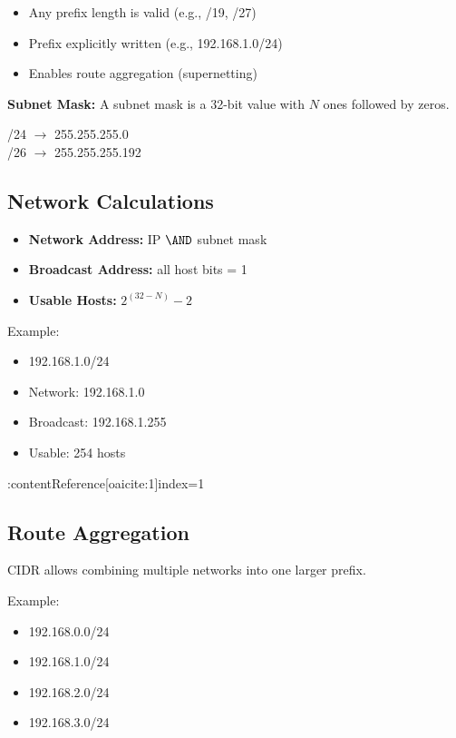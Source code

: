 \begin{itemize}
    \item Any prefix length is valid (e.g., /19, /27)
    \item Prefix explicitly written (e.g., 192.168.1.0/24)
    \item Enables route aggregation (supernetting)
\end{itemize}

\textbf{Subnet Mask:}
A subnet mask is a 32-bit value with $N$ ones followed by zeros.

\begin{center}
/24 $\rightarrow$ 255.255.255.0 \\
/26 $\rightarrow$ 255.255.255.192
\end{center}

\subsection{Network Calculations}
\begin{itemize}
    \item \textbf{Network Address:} IP $\AND$ subnet mask
    \item \textbf{Broadcast Address:} all host bits = 1
    \item \textbf{Usable Hosts:} $2^{(32-N)} - 2$
\end{itemize}

Example:
\begin{itemize}
    \item 192.168.1.0/24
    \item Network: 192.168.1.0
    \item Broadcast: 192.168.1.255
    \item Usable: 254 hosts
\end{itemize} :contentReference[oaicite:1]{index=1}

\subsection{Route Aggregation}
CIDR allows combining multiple networks into one larger prefix.

Example:
\begin{itemize}
    \item 192.168.0.0/24
    \item 192.168.1.0/24
    \item 192.168.2.0/24
    \item 192.168.3.0/24
\end{itemize}

